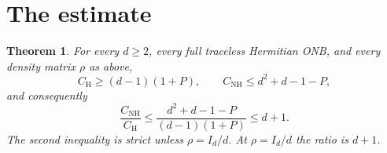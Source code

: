 \documentclass[11pt]{article}
\newcommand{\Id}{I}
\newcommand{\CH}{C_{\mathrm H}}
\newcommand{\CN}{C_{\mathrm{NH}}}
\newtheorem{theorem}{Theorem}
\begin{document}
\section{The estimate}
\begin{theorem}\label{thm:main}
For every $d\geq2$, every full traceless Hermitian ONB, and every density
matrix $\rho$ as above,
\begin{equation}\label{eq:main}
 \CH\geq(d-1)(1+P),\qquad
 \CN\leq d^2+d-1-P,
\end{equation}
and consequently
\begin{equation}\label{eq:ratio}
 \frac{\CN}{\CH}
 \leq \frac{d^2+d-1-P}{(d-1)(1+P)}\leq d+1.
\end{equation}
The second inequality is strict unless $\rho=\Id_d/d$.
At $\rho=\Id_d/d$ the ratio is $d+1$.
\end{theorem}
\end{document}
